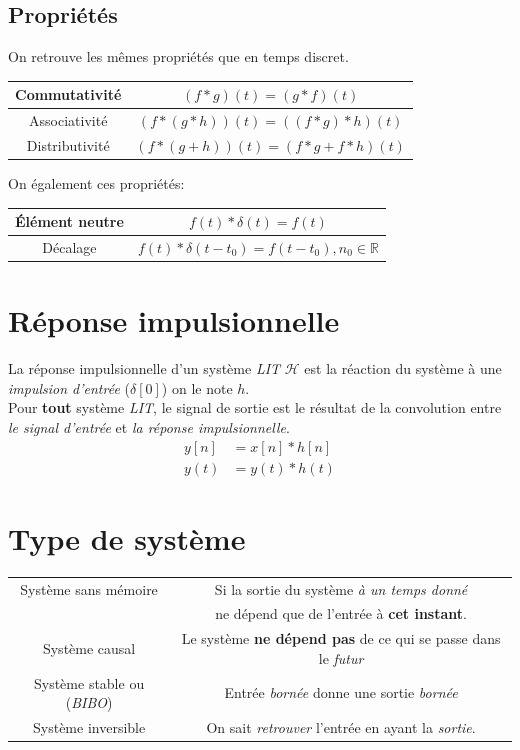 \documentclass{report}
\begin{document}
\subsection{Propriétés}
On retrouve les mêmes propriétés que en temps discret.
\begin{center}
\begin{tabular}{c|c}
	Commutativité & $(f\ast g)(t) = (g \ast f)(t)$ \\
	\hline
	Associativité & $(f \ast (g \ast h))(t) = ((f \ast g) \ast h)(t)$ \\
	\hline
	Distributivité & $(f \ast (g + h))(t) = (f \ast g + f \ast h)(t)$ \\
\end{tabular}
\end{center}
On également ces propriétés:
\begin{center}
\begin{tabular}{c|c}
	Élément neutre & $f(t) \ast \delta(t) = f(t)$ \\
	\hline
	Décalage & $f(t) \ast \delta(t-t_0) = f(t-t_0), n_0 \in \mathbb{R}$ \\
\end{tabular}
\end{center}

\section{Réponse impulsionnelle}
La réponse impulsionnelle d'un système \textit{LIT} $\mathcal{H}$ est la réaction du système à une \textit{impulsion d'entrée} ($\delta[0]$) on le note $h$.\\

Pour \textbf{tout} système \textit{LIT}, le signal de sortie est le résultat de la convolution entre \textit{le signal d'entrée} et \textit{la réponse impulsionnelle}.
\begin{align}
y[n] &= x[n] \ast h[n]\\
y(t) &= y(t) \ast h(t)
\end{align}

\section{Type de système}
\begin{center}
\begin{tabular}{|c|c|}
	\hline
	Système sans mémoire & Si la sortie du système \textit{à un temps donné}\\
	&  ne dépend que de l'entrée à \textbf{cet instant}.\\
	\hline
	Système causal & Le système \textbf{ne dépend pas} de ce qui se passe dans le \textit{futur}\\
	\hline
	Système stable ou (\textit{BIBO}) & Entrée \textit{bornée} donne une sortie \textit{bornée}\\
	\hline
	Système inversible & On sait \textit{retrouver} l'entrée en ayant la \textit{sortie}.\\
	\hline

\end{tabular}
\end{center}
\end{document}
